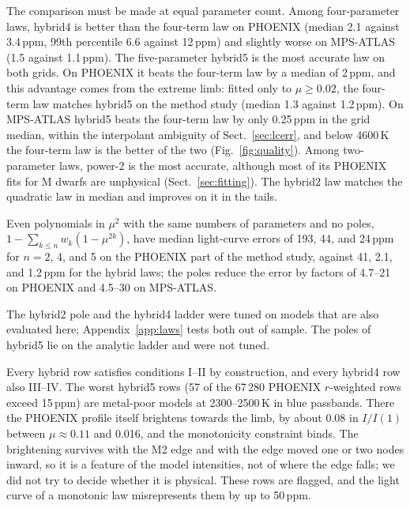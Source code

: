 \documentclass{aa}
\newcommand{\ppm}{\,\textrm{ppm}}
\begin{document}
The comparison must be made at equal parameter count. Among four-parameter
laws, hybrid4 is better than the four-term law on PHOENIX (median 2.1 against
3.4\ppm, 99th percentile 6.6 against 12\ppm) and slightly worse on MPS-ATLAS
(1.5 against 1.1\ppm). The five-parameter hybrid5 is the
most accurate law on both grids. On PHOENIX it beats the four-term law by a median of 2\ppm{}, and
this advantage comes from the extreme limb: fitted only to $\mu\ge0.02$, the
four-term law matches hybrid5 on the method study (median 1.3 against
1.2\ppm). On MPS-ATLAS hybrid5 beats
the four-term law by only 0.25\ppm{} in the grid median, within the
interpolant ambiguity of Sect.~\ref{sec:lcerr}, and below 4600\,K the
four-term law is the better of the two (Fig.~\ref{fig:quality}). Among
two-parameter laws, power-2 is the most accurate, although most of its PHOENIX
fits for M dwarfs are unphysical (Sect.~\ref{sec:fitting}). The hybrid2 law
matches the quadratic law in median and improves on it in the tails.

Even polynomials in $\mu^2$ with the same numbers of parameters and no
poles, $1-\sum_{k\le n}w_k(1-\mu^{2k})$, have median light-curve errors of
193, 44, and 24\ppm{} for $n=2$, 4, and 5 on the PHOENIX part of the method
study, against 41, 2.1, and 1.2\ppm{} for the hybrid laws; the poles reduce
the error by factors of 4.7--21 on PHOENIX and 4.5--30 on MPS-ATLAS.

The hybrid2 pole and the hybrid4 ladder were tuned on models that are also
evaluated here; Appendix~\ref{app:laws} tests both out of sample. The poles
of hybrid5 lie on the analytic ladder and were not tuned.

Every hybrid row satisfies conditions I--II by construction, and every
hybrid4 row also III--IV. The worst hybrid5 rows
(57 of the 67\,280 PHOENIX $r$-weighted rows exceed 15\ppm) are
metal-poor models at 2300--2500\,K in blue passbands. There the PHOENIX
profile itself brightens towards the limb, by about 0.08 in $I/I(1)$ between
$\mu\approx0.11$ and 0.016, and the monotonicity constraint binds. The
brightening survives with the M2 edge and with the edge moved one or two
nodes inward, so it is a feature of the model intensities, not of where the
edge falls; we did not try to decide whether it is physical. These rows are
flagged, and the light curve of a monotonic law misrepresents them by up to
50\ppm.
\end{document}
